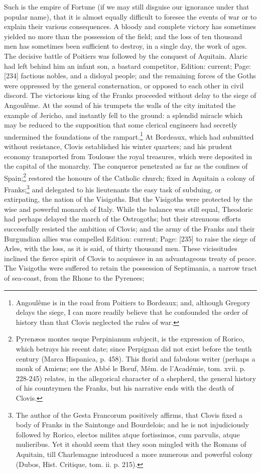 Such is the empire of Fortune (if we may still disguise our ignorance under that popular name), that it is almost equally difficult to foresee the events of war or to explain their various consequences. A bloody and complete victory has sometimes yielded no more than the possession of the field; and the loss of ten thousand men has sometimes been sufficient to destroy, in a single day, the work of ages. The decisive battle of Poitiers was followed by the conquest of Aquitain. Alaric had left behind him an infant son, a bastard competitor, Edition: current; Page: [234] factious nobles, and a disloyal people; and the remaining forces of the Goths were oppressed by the general consternation, or opposed to each other in civil discord. The victorious king of the Franks proceeded without delay to the siege of Angoulême. At the sound of his trumpets the walls of the city imitated the example of Jericho, and instantly fell to the ground: a splendid miracle which may be reduced to the supposition that some clerical engineers had secretly undermined the foundations of the rampart.\footnote{Angoulême is in the road from Poitiers to Bordeaux; and, although Gregory delays the siege, I can more readily believe that he confounded the order of history than that Clovis neglected the rules of war.} At Bordeaux, which had submitted without resistance, Clovis established his winter quarters; and his prudent economy transported from Toulouse the royal treasures, which were deposited in the capital of the monarchy. The conqueror penetrated as far as the confines of Spain;\footnote{Pyrenæos montes usque Perpinianum subjecit, is the expression of Rorico, which betrays his recent date; since Perpignan did not exist before the tenth century (Marca Hispanica, p. 458). This florid and fabulous writer (perhaps a monk of Amiens; see the Abbé le Bœuf, Mém. de l\texthebrew{}’Académie, tom. xvii. p. 228-245) relates, in the allegorical character of a shepherd, the general history of his countrymen the Franks, but his narrative ends with the death of Clovis.} restored the honours of the Catholic church; fixed in Aquitain a colony of Franks;\footnote{The author of the Gesta Francorum positively affirms, that Clovis fixed a body of Franks in the Saintonge and Bourdelois; and he is not injudiciously followed by Rorico, electos milites atque fortissimos, cum parvulis, atque mulieribus. Yet it should seem that they soon mingled with the Romans of Aquitain, till Charlemagne introduced a more numerous and powerful colony (Dubos, Hist. Critique, tom. ii. p. 215).} and delegated to his lieutenants the easy task of subduing, or extirpating, the nation of the Visigoths. But the Visigoths were protected by the wise and powerful monarch of Italy. While the balance was still equal, Theodoric had perhaps delayed the march of the Ostrogoths; but their strenuous efforts successfully resisted the ambition of Clovis; and the army of the Franks and their Burgundian allies was compelled Edition: current; Page: [235] to raise the siege of Arles, with the loss, as it is said, of thirty thousand men. These vicissitudes inclined the fierce spirit of Clovis to acquiesce in an advantageous treaty of peace. The Visigoths were suffered to retain the possession of Septimania, a narrow tract of sea-coast, from the Rhone to the Pyrenees; 